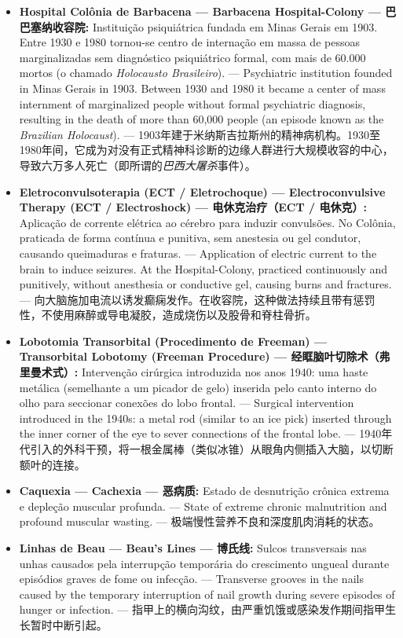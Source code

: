 \vspace{0.4em}
\begin{itemize}[itemsep=0.3em]
  \item \textbf{Hospital Colônia de Barbacena --- Barbacena Hospital-Colony --- 巴巴塞纳收容院:} Instituição psiquiátrica fundada em Minas Gerais em 1903. Entre 1930 e 1980 tornou-se centro de internação em massa de pessoas marginalizadas sem diagnóstico psiquiátrico formal, com mais de 60.000 mortos (o chamado \textit{Holocausto Brasileiro}). --- Psychiatric institution founded in Minas Gerais in 1903. Between 1930 and 1980 it became a center of mass internment of marginalized people without formal psychiatric diagnosis, resulting in the death of more than 60,000 people (an episode known as the \textit{Brazilian Holocaust}). --- 1903年建于米纳斯吉拉斯州的精神病机构。1930至1980年间，它成为对没有正式精神科诊断的边缘人群进行大规模收容的中心，导致六万多人死亡（即所谓的\textit{巴西大屠杀}事件）。
  \item \textbf{Eletroconvulsoterapia (ECT / Eletrochoque) --- Electroconvulsive Therapy (ECT / Electroshock) --- 电休克治疗（ECT / 电休克）:} Aplicação de corrente elétrica ao cérebro para induzir convulsões. No Colônia, praticada de forma contínua e punitiva, sem anestesia ou gel condutor, causando queimaduras e fraturas. --- Application of electric current to the brain to induce seizures. At the Hospital-Colony, practiced continuously and punitively, without anesthesia or conductive gel, causing burns and fractures. --- 向大脑施加电流以诱发癫痫发作。在收容院，这种做法持续且带有惩罚性，不使用麻醉或导电凝胶，造成烧伤以及股骨和脊柱骨折。
  \item \textbf{Lobotomia Transorbital (Procedimento de Freeman) --- Transorbital Lobotomy (Freeman Procedure) --- 经眶脑叶切除术（弗里曼术式）:} Intervenção cirúrgica introduzida nos anos 1940: uma haste metálica (semelhante a um picador de gelo) inserida pelo canto interno do olho para seccionar conexões do lobo frontal. --- Surgical intervention introduced in the 1940s: a metal rod (similar to an ice pick) inserted through the inner corner of the eye to sever connections of the frontal lobe. --- 1940年代引入的外科干预，将一根金属棒（类似冰锥）从眼角内侧插入大脑，以切断额叶的连接。
  \item \textbf{Caquexia --- Cachexia --- 恶病质:} Estado de desnutrição crônica extrema e depleção muscular profunda. --- State of extreme chronic malnutrition and profound muscular wasting. --- 极端慢性营养不良和深度肌肉消耗的状态。
  \item \textbf{Linhas de Beau --- Beau's Lines --- 博氏线:} Sulcos transversais nas unhas causados pela interrupção temporária do crescimento ungueal durante episódios graves de fome ou infecção. --- Transverse grooves in the nails caused by the temporary interruption of nail growth during severe episodes of hunger or infection. --- 指甲上的横向沟纹，由严重饥饿或感染发作期间指甲生长暂时中断引起。

\end{itemize}
